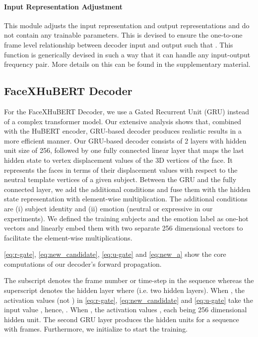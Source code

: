 \documentclass[10pt,twocolumn,letterpaper]{article}
\begin{document}
\paragraph{Input Representation Adjustment}
This module adjusts the input representation and output representations and do not contain any trainable parameters. This is devised to ensure the one-to-one frame level relationship between decoder input  and output  such that . This function is generically devised in such a way that it can handle any input-output frequency pair. More details on this can be found in the supplementary material.

\subsection{FaceXHuBERT Decoder}
For the FaceXHuBERT Decoder, we use a Gated Recurrent Unit (GRU) instead of a complex transformer model. Our extensive analysis shows that, combined with the HuBERT encoder, GRU-based decoder produces realistic results in a more efficient manner. Our GRU-based decoder consists of 2 layers with hidden unit size of 256, followed by one fully connected linear layer that maps the last hidden state to vertex displacement values of the 3D vertices of the face. It represents the faces in terms of their displacement values with respect to the neutral template vertices of a given subject. Between the GRU and the fully connected layer, we add the additional conditions and fuse them with the hidden state representation with element-wise multiplication. The additional conditions are (i) subject identity and (ii) emotion (neutral or expressive in our experiments). We defined the training subjects and the emotion label as one-hot vectors and linearly embed them with two separate 256 dimensional vectors to facilitate the element-wise multiplications. 

\cref{eq:r-gate}, \cref{eq:new_candidate}, \cref{eq:u-gate} and \cref{eq:new_a} show the core computations of our decoder's forward propagation.


\vspace{-1.5em}

\vspace{-1.5em}

\vspace{-1.5em}


The subscript  denotes the frame number or time-step in the sequence whereas the superscript  denotes the hidden layer where  (i.e. two hidden layers). When , the activation values  (not ) in \cref{eq:r-gate}, \cref{eq:new_candidate} and \cref{eq:u-gate} take the input value , hence, . When , the activation values , each being 256 dimensional hidden unit. The second GRU layer produces the hidden units  for a sequence with  frames. Furthermore, we initialize  to start the training.  
\end{document}
